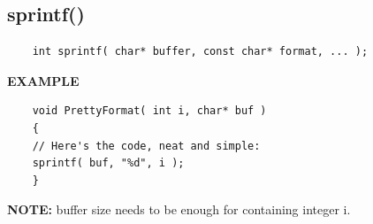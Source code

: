 	\subsection{sprintf()}
	\begin{verbatim}
	int sprintf( char* buffer, const char* format, ... );
	\end{verbatim}
	
	\textbf{EXAMPLE}
	\begin{verbatim}
	void PrettyFormat( int i, char* buf )
	{
	// Here's the code, neat and simple:
	sprintf( buf, "%d", i );
	}
	\end{verbatim}
	
	\textbf{NOTE:} buffer size needs to be enough for containing integer i.
